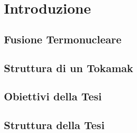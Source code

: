 \chapter{Introduzione}
%

\section{Fusione Termonucleare}

\section{Struttura di un Tokamak}

\section{Obiettivi della Tesi}

\section{Struttura della Tesi}



